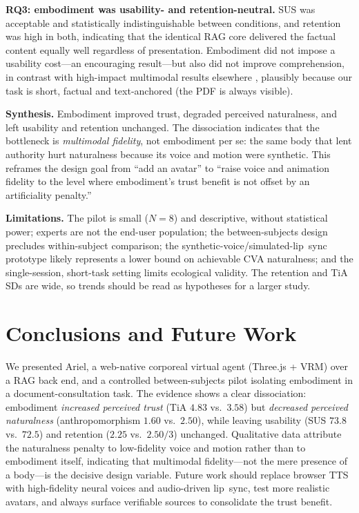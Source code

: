 \documentclass[conference]{IEEEtran}
\begin{document}
\textbf{RQ3: embodiment was usability- and retention-neutral.}
SUS was acceptable and statistically indistinguishable between conditions, and
retention was high in both, indicating that the identical RAG core delivered the
factual content equally well regardless of presentation. Embodiment did not
impose a usability cost---an encouraging result---but also did not improve
comprehension, in contrast with high-impact multimodal results elsewhere
\cite{yang2025health}, plausibly because our task is short, factual and
text-anchored (the PDF is always visible).

\textbf{Synthesis.}
Embodiment improved trust, degraded perceived naturalness, and left usability
and retention unchanged. The dissociation indicates that the bottleneck is
\emph{multimodal fidelity}, not embodiment per se: the same body that lent
authority hurt naturalness because its voice and motion were synthetic. This
reframes the design goal from ``add an avatar'' to ``raise voice and animation
fidelity to the level where embodiment's trust benefit is not offset by an
artificiality penalty.''

\textbf{Limitations.}
The pilot is small ($N=8$) and descriptive, without statistical power; experts
are not the end-user population; the between-subjects design precludes
within-subject comparison; the synthetic-voice/simulated-lip~sync prototype
likely represents a lower bound on achievable CVA naturalness; and the
single-session, short-task setting limits ecological validity. The retention
and TiA SDs are wide, so trends should be read as hypotheses for a larger study.


\section{Conclusions and Future Work}
\label{sec:conclusion}

We presented Ariel, a web-native corporeal virtual agent (Three.js + VRM) over a
RAG back end, and a controlled between-subjects pilot isolating embodiment in a
document-consultation task. The evidence shows a clear dissociation: embodiment
\emph{increased perceived trust} (TiA $4.83$ vs.\ $3.58$) but \emph{decreased
perceived naturalness} (anthropomorphism $1.60$ vs.\ $2.50$), while leaving
usability (SUS $73.8$ vs.\ $72.5$) and retention ($2.25$ vs.\ $2.50/3$)
unchanged. Qualitative data attribute the naturalness penalty to low-fidelity
voice and motion rather than to embodiment itself, indicating that multimodal
fidelity---not the mere presence of a body---is the decisive design variable.
Future work should replace browser TTS with high-fidelity neural voices and
audio-driven lip~sync, test more realistic avatars, and always surface verifiable
sources to consolidate the trust benefit.
\end{document}
